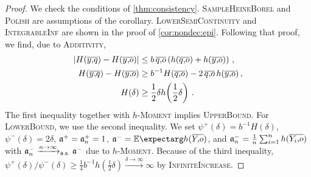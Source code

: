 \begin{proof}
	We check the conditions of \autoref{thm:consistency}. \textsc{SampleHeineBorel} and \textsc{Polish} are assumptions of the corollary. \textsc{LowerSemiContinuity} and \textsc{IntegrableInf} are shown in the proof of \autoref{cor:nondec:epi}.
	Following that proof, we find, due to \textsc{Additivity},
	\begin{align*}
		\abs{H(\ol yq) - H(\ol yo)} &\leq b\, \ol qo \br{h(\ol qo) + h(\ol yo)}\eqcm
		\\
		H(\ol yq) - H(\ol yo) &\geq 	b^{-1} H( \ol qo) - 2 \,\ol qo\, h( \ol yo)\eqcm\\
		H(\delta)  &\geq \frac12 \delta h\brOf{\frac12 \delta}
		\eqfs
	\end{align*}
	The first inequality together with \textsc{$h$-Moment} implies \textsc{UpperBound}.
	For \textsc{LowerBound}, we use the second inequality. We set $\psi^+(\delta) = 	b^{-1} H(\delta)$, $\psi^-(\delta) = 2 \delta$, $\mathfrak{a}^+=\mathfrak{a}_n^+ = 1$, $\mf a^{-} = \Ex{h(\ol Yo)}$, and $\mathfrak{a}^-_n = \frac1n \sum_{i=1}^n h(\overline{Y_i,\!o})$ with $\mathfrak{a}^-_n\xrightarrow{n\to\infty}_{\mathsf{a.s.}}\mathfrak{a}^-$ due to \textsc{$h$-Moment}. Because of the third inequality, $\psi^+(\delta)/\psi^-(\delta) \geq \frac14 b^{-1} h(\frac12 \delta) \xrightarrow{\delta\to\infty} \infty$ by \textsc{InfiniteIncrease}.
\end{proof}
%